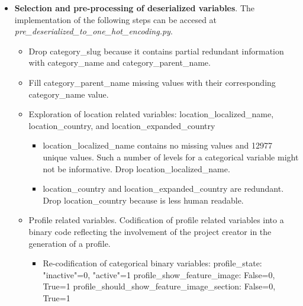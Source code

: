 \documentclass{article}
\begin{document}
{\begin{itemize}
    \item \textbf{Selection and pre-processing of deserialized variables}.
    The implementation of the following steps can be accesed at \emph{pre\_deserialized\_to\_one\_hot\_encoding.py}.
    \begin{itemize}
 
        \item Drop category\_slug because it contains partial redundant information with category\_name and category\_parent\_name.
        \item Fill category\_parent\_name missing values with their corresponding category\_name value.
        \item Exploration of location related variables: location\_localized\_name, location\_country, and location\_expanded\_country
	\begin{itemize}
            \item location\_localized\_name contains no missing values and 12977 unique values. Such a number of levels for a categorical variable might not be informative. Drop location\_localized\_name.
            \item location\_country and location\_expanded\_country are redundant. Drop location\_country because is less human readable.
	\end{itemize}
	\item Profile related variables. Codification of profile related variables into a binary code reflecting the involvement of the project creator in the generation of a profile.
	\begin{itemize}
            \item Re-codification of categorical binary variables:
	    profile\_state: "inactive"=0, "active"=1
            profile\_show\_feature\_image: False=0, True=1
            profile\_should\_show\_feature\_image\_section: False=0, True=1


\end{itemize}
\end{itemize}
\end{itemize}}
\end{document}
